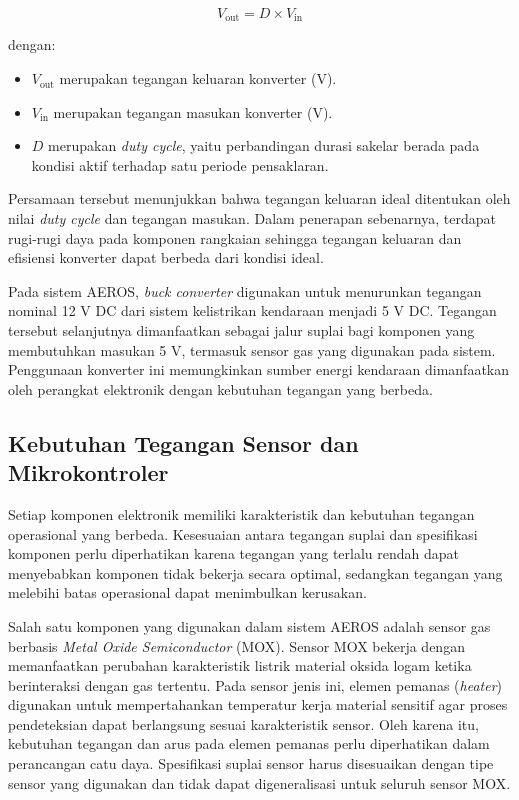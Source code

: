 \begin{equation}
    \label{eq:Buck_Converter}
    V_{\text{out}} = D \times V_{\text{in}}
\end{equation}

dengan:
\begin{itemize}
    \item $V_{\text{out}}$ merupakan tegangan keluaran konverter (V).
    \item $V_{\text{in}}$ merupakan tegangan masukan konverter (V).
    \item $D$ merupakan \textit{duty cycle}, yaitu perbandingan durasi sakelar berada pada kondisi aktif terhadap satu periode pensaklaran.
\end{itemize}

Persamaan tersebut menunjukkan bahwa tegangan keluaran ideal ditentukan oleh nilai \textit{duty cycle} dan tegangan masukan. Dalam penerapan sebenarnya, terdapat rugi-rugi daya pada komponen rangkaian sehingga tegangan keluaran dan efisiensi konverter dapat berbeda dari kondisi ideal.

Pada sistem AEROS, \textit{buck converter} digunakan untuk menurunkan tegangan nominal 12 V DC dari sistem kelistrikan kendaraan menjadi 5 V DC. Tegangan tersebut selanjutnya dimanfaatkan sebagai jalur suplai bagi komponen yang membutuhkan masukan 5 V, termasuk sensor gas yang digunakan pada sistem. Penggunaan konverter ini memungkinkan sumber energi kendaraan dimanfaatkan oleh perangkat elektronik dengan kebutuhan tegangan yang berbeda.

\subsection{Kebutuhan Tegangan Sensor dan Mikrokontroler}
\label{subsec:Kebutuhan_Tegangan_Komponen}

Setiap komponen elektronik memiliki karakteristik dan kebutuhan tegangan operasional yang berbeda. Kesesuaian antara tegangan suplai dan spesifikasi komponen perlu diperhatikan karena tegangan yang terlalu rendah dapat menyebabkan komponen tidak bekerja secara optimal, sedangkan tegangan yang melebihi batas operasional dapat menimbulkan kerusakan.

Salah satu komponen yang digunakan dalam sistem AEROS adalah sensor gas berbasis \textit{Metal Oxide Semiconductor} (MOX). Sensor MOX bekerja dengan memanfaatkan perubahan karakteristik listrik material oksida logam ketika berinteraksi dengan gas tertentu. Pada sensor jenis ini, elemen pemanas (\textit{heater}) digunakan untuk mempertahankan temperatur kerja material sensitif agar proses pendeteksian dapat berlangsung sesuai karakteristik sensor. Oleh karena itu, kebutuhan tegangan dan arus pada elemen pemanas perlu diperhatikan dalam perancangan catu daya. Spesifikasi suplai sensor harus disesuaikan dengan tipe sensor yang digunakan dan tidak dapat digeneralisasi untuk seluruh sensor MOX.

